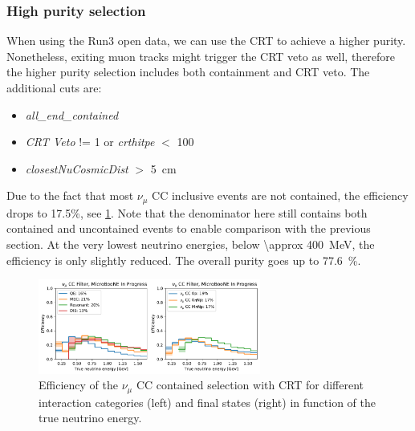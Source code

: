 \subsubsection{High purity selection}
When using the Run3 open data, we can use the CRT to achieve  a higher purity. Nonetheless, exiting muon tracks might trigger the CRT veto as well, therefore the higher purity selection includes both containment and CRT veto. The additional cuts are:
\begin{itemize}
    \item \textit{all\_end\_contained}
    \item \textit{CRT Veto} != 1 or \textit{crthitpe} $<$ 100
    \item \textit{closestNuCosmicDist} $>$ \SI{5}{\cm}
\end{itemize}
Due to the fact that most $\nu_\mu$ CC inclusive events are not contained, the efficiency drops to 17.5\%, see \cref{fig:numu:eff_r3}. Note that the denominator here still contains both contained and uncontained events to enable comparison with the previous section. At the very lowest neutrino energies, below \SI{\approx 400}{\MeV}, the efficiency is only slightly reduced. The overall purity goes up to \SI{77.6}{\%}. 

\begin{figure}[H]
    \centering
    \includegraphics[width=0.65\textwidth]{NuMuCCsel/Images/run3/numu_efficiency_run3.pdf}
    \caption{Efficiency of the $\nu_\mu$ CC contained selection with CRT for different interaction categories (left) and final states (right) in function of the true neutrino energy.}
    \label{fig:numu:eff_r3}
\end{figure}


